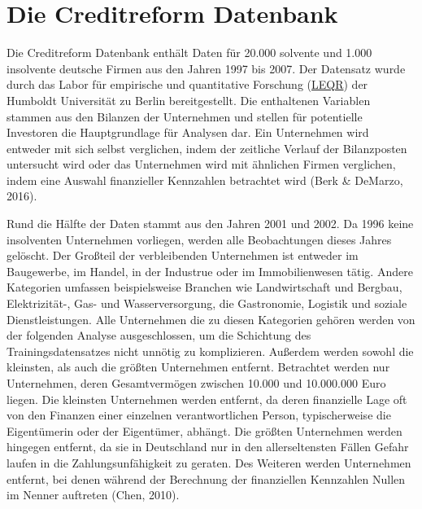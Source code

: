 \documentclass{article}
\begin{document}
\section{Die Creditreform Datenbank}

Die Creditreform Datenbank enth{\"a}lt Daten f{\"u}r 20.000 solvente und 1.000 insolvente deutsche Firmen aus den Jahren 1997 bis 2007. Der Datensatz wurde durch das Labor f{\"u}r empirische und quantitative Forschung (\href{https://leqr.wiwi.hu-berlin.de/leqr/content/databaseInformation/creditreform/creditreform.htm}{LEQR}) der Humboldt Universit{\"a}t zu Berlin bereitgestellt. Die enthaltenen Variablen stammen aus den Bilanzen der Unternehmen und stellen f{\"u}r potentielle Investoren die Hauptgrundlage f{\"u}r Analysen dar. Ein Unternehmen wird entweder mit sich selbst verglichen, indem der zeitliche Verlauf der Bilanzposten untersucht wird oder das Unternehmen wird mit {\"a}hnlichen Firmen verglichen, indem eine Auswahl finanzieller Kennzahlen betrachtet wird (Berk \& DeMarzo, 2016).

Rund die H{\"a}lfte der Daten stammt aus den Jahren 2001 und 2002. Da 1996 keine insolventen Unternehmen vorliegen, werden alle Beobachtungen dieses Jahres gel{\"o}scht. Der Gro{\ss}teil der verbleibenden Unternehmen ist entweder im Baugewerbe, im Handel, in der Industrue oder im Immobilienwesen t{\"a}tig. Andere Kategorien umfassen beispielsweise Branchen wie Landwirtschaft und Bergbau, Elektrizit{\"a}t-, Gas- und Wasserversorgung, die Gastronomie, Logistik und soziale Dienstleistungen. Alle Unternehmen die zu diesen Kategorien geh{\"o}ren werden von der folgenden Analyse ausgeschlossen, um die Schichtung des Trainingsdatensatzes nicht unn{\"o}tig zu komplizieren. Au{\ss}erdem werden sowohl die kleinsten, als auch die gr{\"o}{\ss}ten Unternehmen entfernt. Betrachtet werden nur Unternehmen, deren Gesamtverm{\"o}gen zwischen 10.000 und 10.000.000 Euro liegen. Die kleinsten Unternehmen werden entfernt, da deren finanzielle Lage oft von den Finanzen einer einzelnen verantwortlichen Person, typischerweise die Eigent{\"u}merin oder der Eigent{\"u}mer, abh{\"a}ngt. Die gr{\"o}{\ss}ten Unternehmen werden hingegen entfernt, da sie in Deutschland nur in den allerseltensten F{\"a}llen Gefahr laufen in die Zahlungsunf{\"a}higkeit zu geraten. Des Weiteren werden Unternehmen entfernt, bei denen w{\"a}hrend der Berechnung der finanziellen Kennzahlen Nullen im Nenner auftreten (Chen, 2010).
\end{document}
